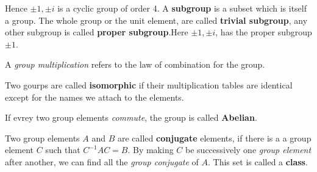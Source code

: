             \bulletpar Hence $\pm 1, \pm i$ is a cyclic group of order 4. A \textbf{subgroup} is a subset which is itself a group. The whole group or the unit element, 
            are called \textbf{trivial subgroup}, any other subgroup is called \textbf{proper subgroup}.Here $\pm 1, \pm i$, has the proper subgroup $\pm 1$.

            \bulletpar A \textit{group multiplication} refers to the law of combination for  the group.

            \bulletpar Two gourps are called \textbf{isomorphic} if their multiplication tables are identical except for the names we attach to the elements.
            
            \bulletpar If evrey two group elements \textit{commute}, the group is called \textbf{Abelian}.

            \bulletpar Two group elements $A$ and $B$ are called \textbf{conjugate} elements, if there is a a group element $C$ such that $C^{-1}AC = B$. By making $C$
            be successively one \textit{group element} after another, we can find all the \textit{group conjugate} of $A$. This set is called a \textbf{class}.
            